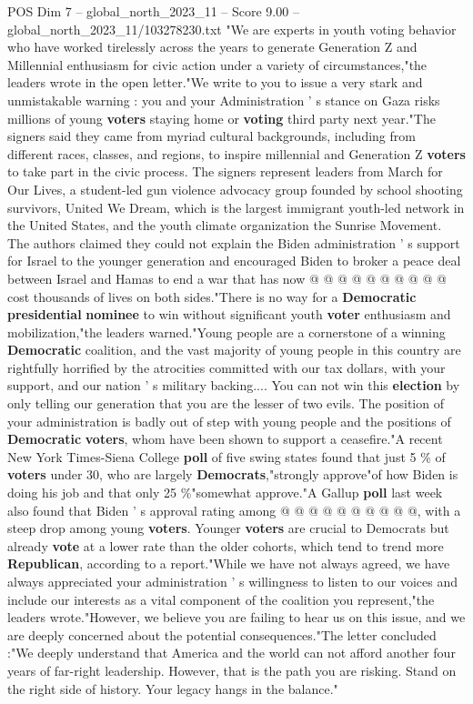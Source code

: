 \begin{textsample}{POS Dim 7 – global\_north\_2023\_11 – Score 9.00 – global\_north\_2023\_11/103278230.txt}  \label{ex:f7_pos_133}
"We are experts in youth voting behavior who have worked tirelessly across the years to generate Generation Z and Millennial enthusiasm for civic action under a variety of circumstances,"the leaders wrote in the open letter."We write to you to issue a very stark and unmistakable warning : you and your Administration ' s stance on Gaza risks millions of young \textbf{voters} staying home or \textbf{voting} third party next year."The signers said they came from myriad cultural backgrounds, including from different races, classes, and regions, to inspire millennial and Generation Z \textbf{voters} to take part in the civic process.
The signers represent leaders from March for Our Lives, a student-led gun violence advocacy group founded by school shooting survivors, United We Dream, which is the largest immigrant youth-led network in the United States, and the youth climate organization the Sunrise Movement.
The authors claimed they could not explain the Biden administration ' s support for Israel to the younger generation and encouraged Biden to broker a peace deal between Israel and Hamas to end a war that has now @ @ @ @ @ @ @ @ @ @ cost thousands of lives on both sides."There is no way for a \textbf{Democratic} \textbf{presidential} \textbf{nominee} to win without significant youth \textbf{voter} enthusiasm and mobilization,"the leaders warned."Young people are a cornerstone of a winning \textbf{Democratic} coalition, and the vast majority of young people in this country are rightfully horrified by the atrocities committed with our tax dollars, with your support, and our nation ' s military backing....
You can not win this \textbf{election} by only telling our generation that you are the lesser of two evils.
The position of your administration is badly out of step with young people and the positions of \textbf{Democratic} \textbf{voters}, whom have been shown to support a ceasefire."A recent New York Times-Siena College \textbf{poll} of five swing states found that just 5 \% of \textbf{voters} under 30, who are largely \textbf{Democrats},"strongly approve"of how Biden is doing his job and that only 25 \%"somewhat approve."A Gallup \textbf{poll} last week also found that Biden ' s approval rating among @ @ @ @ @ @ @ @ @ @, with a steep drop among young \textbf{voters}.
Younger \textbf{voters} are crucial to Democrats but already \textbf{vote} at a lower rate than the older cohorts, which tend to trend more \textbf{Republican}, according to a report."While we have not always agreed, we have always appreciated your administration ' s willingness to listen to our voices and include our interests as a vital component of the coalition you represent,"the leaders wrote."However, we believe you are failing to hear us on this issue, and we are deeply concerned about the potential consequences."The letter concluded :"We deeply understand that America and the world can not afford another four years of far-right leadership.
However, that is the path you are risking.
Stand on the right side of history.
Your legacy hangs in the balance."

\end{textsample}
